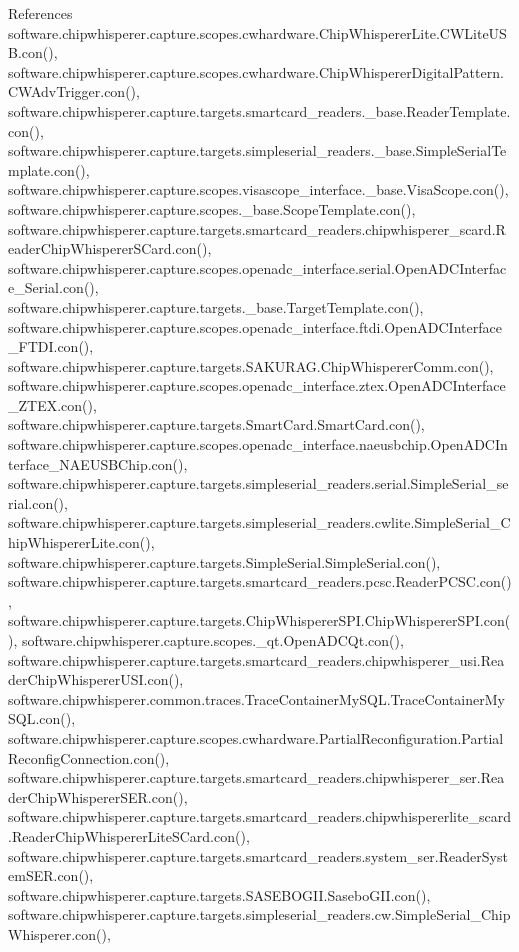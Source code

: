 References software.\+chipwhisperer.\+capture.\+scopes.\+cwhardware.\+Chip\+Whisperer\+Lite.\+C\+W\+Lite\+U\+S\+B.\+con(), software.\+chipwhisperer.\+capture.\+scopes.\+cwhardware.\+Chip\+Whisperer\+Digital\+Pattern.\+C\+W\+Adv\+Trigger.\+con(), software.\+chipwhisperer.\+capture.\+targets.\+smartcard\+\_\+readers.\+\_\+base.\+Reader\+Template.\+con(), software.\+chipwhisperer.\+capture.\+targets.\+simpleserial\+\_\+readers.\+\_\+base.\+Simple\+Serial\+Template.\+con(), software.\+chipwhisperer.\+capture.\+scopes.\+visascope\+\_\+interface.\+\_\+base.\+Visa\+Scope.\+con(), software.\+chipwhisperer.\+capture.\+scopes.\+\_\+base.\+Scope\+Template.\+con(), software.\+chipwhisperer.\+capture.\+targets.\+smartcard\+\_\+readers.\+chipwhisperer\+\_\+scard.\+Reader\+Chip\+Whisperer\+S\+Card.\+con(), software.\+chipwhisperer.\+capture.\+scopes.\+openadc\+\_\+interface.\+serial.\+Open\+A\+D\+C\+Interface\+\_\+\+Serial.\+con(), software.\+chipwhisperer.\+capture.\+targets.\+\_\+base.\+Target\+Template.\+con(), software.\+chipwhisperer.\+capture.\+scopes.\+openadc\+\_\+interface.\+ftdi.\+Open\+A\+D\+C\+Interface\+\_\+\+F\+T\+D\+I.\+con(), software.\+chipwhisperer.\+capture.\+targets.\+S\+A\+K\+U\+R\+A\+G.\+Chip\+Whisperer\+Comm.\+con(), software.\+chipwhisperer.\+capture.\+scopes.\+openadc\+\_\+interface.\+ztex.\+Open\+A\+D\+C\+Interface\+\_\+\+Z\+T\+E\+X.\+con(), software.\+chipwhisperer.\+capture.\+targets.\+Smart\+Card.\+Smart\+Card.\+con(), software.\+chipwhisperer.\+capture.\+scopes.\+openadc\+\_\+interface.\+naeusbchip.\+Open\+A\+D\+C\+Interface\+\_\+\+N\+A\+E\+U\+S\+B\+Chip.\+con(), software.\+chipwhisperer.\+capture.\+targets.\+simpleserial\+\_\+readers.\+serial.\+Simple\+Serial\+\_\+serial.\+con(), software.\+chipwhisperer.\+capture.\+targets.\+simpleserial\+\_\+readers.\+cwlite.\+Simple\+Serial\+\_\+\+Chip\+Whisperer\+Lite.\+con(), software.\+chipwhisperer.\+capture.\+targets.\+Simple\+Serial.\+Simple\+Serial.\+con(), software.\+chipwhisperer.\+capture.\+targets.\+smartcard\+\_\+readers.\+pcsc.\+Reader\+P\+C\+S\+C.\+con(), software.\+chipwhisperer.\+capture.\+targets.\+Chip\+Whisperer\+S\+P\+I.\+Chip\+Whisperer\+S\+P\+I.\+con(), software.\+chipwhisperer.\+capture.\+scopes.\+\_\+qt.\+Open\+A\+D\+C\+Qt.\+con(), software.\+chipwhisperer.\+capture.\+targets.\+smartcard\+\_\+readers.\+chipwhisperer\+\_\+usi.\+Reader\+Chip\+Whisperer\+U\+S\+I.\+con(), software.\+chipwhisperer.\+common.\+traces.\+Trace\+Container\+My\+S\+Q\+L.\+Trace\+Container\+My\+S\+Q\+L.\+con(), software.\+chipwhisperer.\+capture.\+scopes.\+cwhardware.\+Partial\+Reconfiguration.\+Partial\+Reconfig\+Connection.\+con(), software.\+chipwhisperer.\+capture.\+targets.\+smartcard\+\_\+readers.\+chipwhisperer\+\_\+ser.\+Reader\+Chip\+Whisperer\+S\+E\+R.\+con(), software.\+chipwhisperer.\+capture.\+targets.\+smartcard\+\_\+readers.\+chipwhispererlite\+\_\+scard.\+Reader\+Chip\+Whisperer\+Lite\+S\+Card.\+con(), software.\+chipwhisperer.\+capture.\+targets.\+smartcard\+\_\+readers.\+system\+\_\+ser.\+Reader\+System\+S\+E\+R.\+con(), software.\+chipwhisperer.\+capture.\+targets.\+S\+A\+S\+E\+B\+O\+G\+I\+I.\+Sasebo\+G\+I\+I.\+con(), software.\+chipwhisperer.\+capture.\+targets.\+simpleserial\+\_\+readers.\+cw.\+Simple\+Serial\+\_\+\+Chip\+Whisperer.\+con(), 